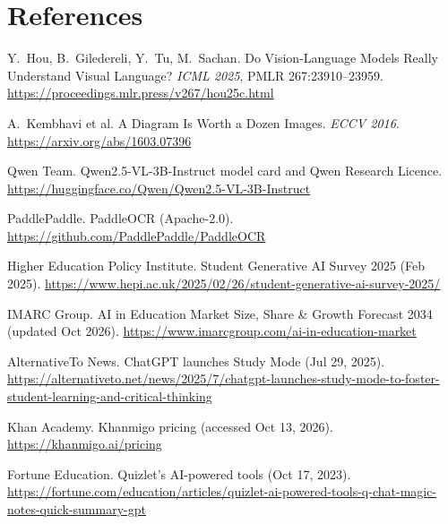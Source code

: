 \documentclass[11pt,letterpaper]{article}
\begin{document}
\section*{References}
{\footnotesize
\begin{enumerate}[label={[\arabic*]},leftmargin=2em,itemsep=0pt]
\item Y.~Hou, B.~Giledereli, Y.~Tu, M.~Sachan. Do Vision-Language Models Really Understand Visual Language? \emph{ICML 2025}, PMLR 267:23910--23959. \url{https://proceedings.mlr.press/v267/hou25c.html}
\item A.~Kembhavi et al. A Diagram Is Worth a Dozen Images. \emph{ECCV 2016}. \url{https://arxiv.org/abs/1603.07396}
\item Qwen Team. Qwen2.5-VL-3B-Instruct model card and Qwen Research Licence. \url{https://huggingface.co/Qwen/Qwen2.5-VL-3B-Instruct}
\item PaddlePaddle. PaddleOCR (Apache-2.0). \url{https://github.com/PaddlePaddle/PaddleOCR}
\item Higher Education Policy Institute. Student Generative AI Survey 2025 (Feb 2025). \url{https://www.hepi.ac.uk/2025/02/26/student-generative-ai-survey-2025/}
\item IMARC Group. AI in Education Market Size, Share \& Growth Forecast 2034 (updated Oct 2026). \url{https://www.imarcgroup.com/ai-in-education-market}
\item AlternativeTo News. ChatGPT launches Study Mode (Jul 29, 2025). \url{https://alternativeto.net/news/2025/7/chatgpt-launches-study-mode-to-foster-student-learning-and-critical-thinking}
\item Khan Academy. Khanmigo pricing (accessed Oct 13, 2026). \url{https://khanmigo.ai/pricing}
\item Fortune Education. Quizlet's AI-powered tools (Oct 17, 2023). \url{https://fortune.com/education/articles/quizlet-ai-powered-tools-q-chat-magic-notes-quick-summary-gpt}
\end{enumerate}}
\end{document}
